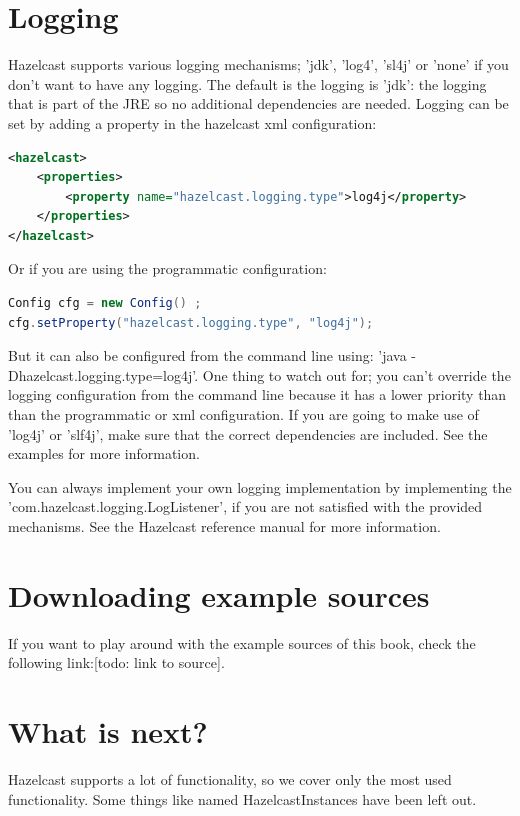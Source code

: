 \section{Logging}
Hazelcast supports various logging mechanisms; 'jdk', 'log4', 'sl4j' or 'none' if you don't want to have any logging. The default is the logging is 'jdk': the logging that is part of the JRE so no additional dependencies are needed. Logging can be set by adding a property in the hazelcast xml configuration:
\begin{lstlisting}[language=xml]
<hazelcast>
    <properties>
        <property name="hazelcast.logging.type">log4j</property>
    </properties>
</hazelcast>
\end{lstlisting}
Or if you are using the programmatic configuration:
\begin{lstlisting}[language=java]
Config cfg = new Config() ;
cfg.setProperty("hazelcast.logging.type", "log4j");
\end{lstlisting}
But it can also be configured from the command line using: 'java -Dhazelcast.logging.type=log4j'. One thing to watch out for; you can't override the logging configuration from the command line because it has a lower priority than than the programmatic or xml configuration. If you are going to make use of 'log4j' or 'slf4j', make sure that the correct dependencies are included. See the examples for more information.

You can always implement your own logging implementation by implementing the 'com.hazelcast.logging.LogListener', if you are not satisfied with the provided mechanisms. See the Hazelcast reference manual for more information.

\section{Downloading example sources}
If you want to play around with the example sources of this book, check the following link:[todo: link to source]. 

\section{What is next?}
Hazelcast supports a lot of functionality, so we cover only the most used functionality. Some things like named HazelcastInstances have been left out.